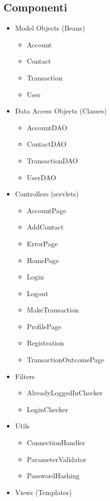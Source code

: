 \documentclass{article}
\begin{document}
\subsection{Componenti}
\begin{itemize}
	\item Model Objects (Beans)
	\begin{itemize}
		\item Account
		\item Contact
		\item Transaction
		\item User
	\end{itemize}
	\item Data Access Objects (Classes)
	\begin{itemize}
		\item AccountDAO
		\item ContactDAO
		\item TransactionDAO
		\item UserDAO
	\end{itemize}
	\item Controllers (servlets)
	\begin{itemize}
		\item AccountPage
		\item AddContact
		\item ErrorPage
		\item HomePage
		\item Login
		\item Logout
		\item MakeTransaction
		\item ProfilePage
		\item Registration
		\item TransactionOutcomePage
	\end{itemize}
	\item Filters
	\begin{itemize}
		\item AlreadyLoggedInChecker
		\item LoginChecker
	\end{itemize}
	\item Utils
	\begin{itemize}
		\item ConnectionHandler
		\item ParameterValidator
		\item PasswordHashing
	\end{itemize}
	\item Views (Templates)
	\begin{itemize}

\end{itemize}
\end{itemize}
\end{document}
